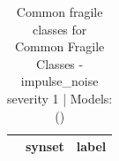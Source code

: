 \begin{table}
\caption{Common fragile classes for Common Fragile Classes - impulse_noise severity 1 | Models: ()}
\label{tab:Common Fragile Classes - impulse_noise severity 1_d41d8cd9}
\begin{tabular}{cll}
\toprule
 & synset & label \\
\midrule
\bottomrule
\end{tabular}
\end{table}
